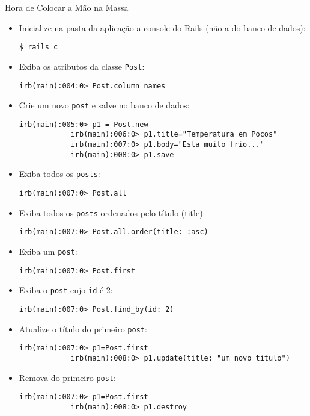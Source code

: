 \begin{frame}{Hora de Colocar a Mão na Massa}
	\begin{itemize}
		\item Inicialize \alert{na pasta da aplicação} a console do Rails (não a do banco de dados):
		\begin{lstlisting}[style=BashInputBasicStyle]
			$ rails c
		\end{lstlisting}
		
		\item Exiba os atributos da classe \verb|Post|:
		\begin{lstlisting}[style=BashInputBasicStyle]
			irb(main):004:0> Post.column_names
		\end{lstlisting}
		
		\item Crie um novo \verb|post| e salve no banco de dados:
		\begin{lstlisting}[style=BashInputBasicStyle]
			irb(main):005:0> p1 = Post.new
			irb(main):006:0> p1.title="Temperatura em Pocos"
			irb(main):007:0> p1.body="Esta muito frio..."
			irb(main):008:0> p1.save
		\end{lstlisting}
		
		\item Exiba todos os \verb|posts|:
		\begin{lstlisting}[style=BashInputBasicStyle]
			irb(main):007:0> Post.all
		\end{lstlisting}
		
		\item Exiba todos os \verb|posts| ordenados pelo título (title):
		\begin{lstlisting}[style=BashInputBasicStyle]
			irb(main):007:0> Post.all.order(title: :asc)
		\end{lstlisting}
		
		\item Exiba um \verb|post|:
		\begin{lstlisting}[style=BashInputBasicStyle]
			irb(main):007:0> Post.first
		\end{lstlisting}
		
		\item Exiba o \verb|post| cujo \verb|id| é 2:
		\begin{lstlisting}[style=BashInputBasicStyle]
			irb(main):007:0> Post.find_by(id: 2)
		\end{lstlisting}
		
		\item Atualize o título do primeiro \verb|post|:
		\begin{lstlisting}[style=BashInputBasicStyle]
			irb(main):007:0> p1=Post.first
			irb(main):008:0> p1.update(title: "um novo titulo")
		\end{lstlisting}
		
		\item Remova do primeiro \verb|post|:
		\begin{lstlisting}[style=BashInputBasicStyle]
			irb(main):007:0> p1=Post.first
			irb(main):008:0> p1.destroy
		\end{lstlisting}
		
	\end{itemize}
\end{frame}